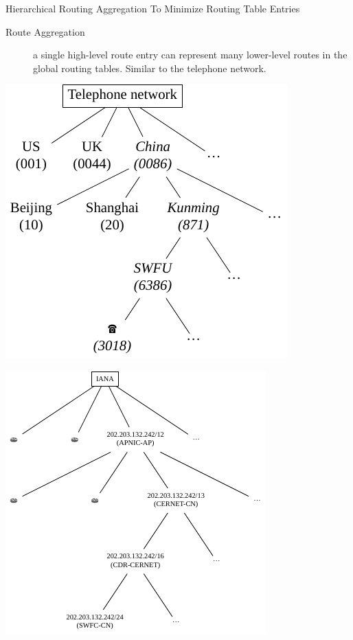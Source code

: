 \begin{frame}{Hierarchical Routing Aggregation To Minimize Routing Table Entries}
  \begin{description}
  \item[Route Aggregation] a single high-level route entry can represent many lower-level
    routes in the global routing tables. Similar to the telephone network.
  \end{description}
    \begin{minipage}{.45\linewidth}
    \includegraphics[width=\textwidth]{hierarchy-phone}
  \end{minipage}\quad
  \begin{minipage}{.45\linewidth}
    \includegraphics[width=\textwidth]{hierarchy-cidr}
  \end{minipage}
\end{frame}

